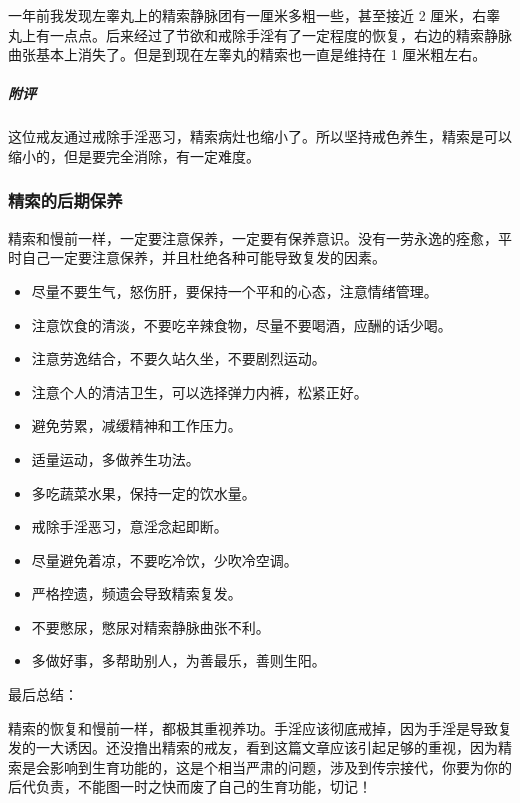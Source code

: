 \begin{case}[精索静脉曲张]
    一年前我发现左睾丸上的精索静脉团有一厘米多粗一些，甚至接近 2 厘米，右睾丸上有一点点。后来经过了节欲和戒除手淫有了一定程度的恢复，右边的精索静脉曲张基本上消失了。但是到现在左睾丸的精索也一直是维持在 1 厘米粗左右。
    \subparagraph{附评} 这位戒友通过戒除手淫恶习，精索病灶也缩小了。所以坚持戒色养生，精索是可以缩小的，但是要完全消除，有一定难度。
\end{case}

\subsubsection{精索的后期保养}

精索和慢前一样，一定要注意保养，一定要有保养意识。没有一劳永逸的痊愈，平时自己一定要注意保养，并且杜绝各种可能导致复发的因素。

\begin{multicols}{2}
    \begin{itemize}
        \item 尽量不要生气，怒伤肝，要保持一个平和的心态，注意情绪管理。
        \item 注意饮食的清淡，不要吃辛辣食物，尽量不要喝酒，应酬的话少喝。
        \item 注意劳逸结合，不要久站久坐，不要剧烈运动。
        \item 注意个人的清洁卫生，可以选择弹力内裤，松紧正好。
        \item 避免劳累，减缓精神和工作压力。
        \item 适量运动，多做养生功法。
        \item 多吃蔬菜水果，保持一定的饮水量。
        \item 戒除手淫恶习，意淫念起即断。
        \item 尽量避免着凉，不要吃冷饮，少吹冷空调。
        \item 严格控遗，频遗会导致精索复发。
        \item 不要憋尿，憋尿对精索静脉曲张不利。
        \item 多做好事，多帮助别人，为善最乐，善则生阳。
    \end{itemize}
\end{multicols}

最后总结：

精索的恢复和慢前一样，都极其重视养功。手淫应该彻底戒掉，因为手淫是导致复发的一大诱因。还没撸出精索的戒友，看到这篇文章应该引起足够的重视，因为精索是会影响到生育功能的，这是个相当严肃的问题，涉及到传宗接代，你要为你的后代负责，不能图一时之快而废了自己的生育功能，切记！

